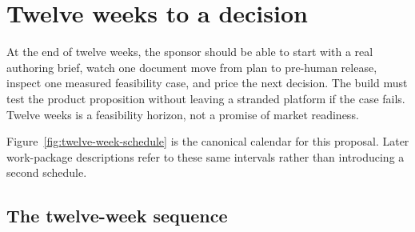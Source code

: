 \chapter{Twelve weeks to a decision}
\label{ch:implementation}

At the end of twelve weeks, the sponsor should be able to start with a real
authoring brief, watch one document move from plan to pre-human release, inspect
one measured feasibility case, and price the next decision. The build must test
the product proposition without leaving a stranded platform if the case fails.
Twelve weeks is a feasibility horizon, not a promise of market readiness.

Figure~\ref{fig:twelve-week-schedule} is the canonical calendar for this
proposal. Later work-package descriptions refer to these same intervals rather
than introducing a second schedule.

\hvFigureSchedule

\section{The twelve-week sequence}

